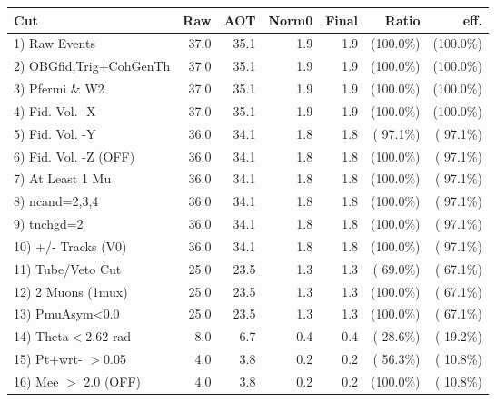 \begin{table}[h!]\centering
 \begin{tabular}{||l||r|r|r|r|r|r||}
 \hline
 \hline
 Cut & Raw & AOT & Norm0 & Final & Ratio & eff.       \\
 \hline
  1) Raw Events           &         37.0 &         35.1 &          1.9 &          1.9 & (100.0\%) & (100.0\%) \\
  2) OBGfid,Trig+CohGenTh &         37.0 &         35.1 &          1.9 &          1.9 & (100.0\%) & (100.0\%) \\
  3) Pfermi \& W2         &         37.0 &         35.1 &          1.9 &          1.9 & (100.0\%) & (100.0\%) \\
  4) Fid. Vol. -X         &         37.0 &         35.1 &          1.9 &          1.9 & (100.0\%) & (100.0\%) \\
  5) Fid. Vol. -Y         &         36.0 &         34.1 &          1.8 &          1.8 & ( 97.1\%) & ( 97.1\%) \\
  6) Fid. Vol. -Z (OFF)   &         36.0 &         34.1 &          1.8 &          1.8 & (100.0\%) & ( 97.1\%) \\
  7) At Least 1 Mu        &         36.0 &         34.1 &          1.8 &          1.8 & (100.0\%) & ( 97.1\%) \\
  8) ncand=2,3,4          &         36.0 &         34.1 &          1.8 &          1.8 & (100.0\%) & ( 97.1\%) \\
  9) tnchgd=2             &         36.0 &         34.1 &          1.8 &          1.8 & (100.0\%) & ( 97.1\%) \\
 10) +/- Tracks (V0)      &         36.0 &         34.1 &          1.8 &          1.8 & (100.0\%) & ( 97.1\%) \\
 11) Tube/Veto Cut        &         25.0 &         23.5 &          1.3 &          1.3 & ( 69.0\%) & ( 67.1\%) \\
 12) 2 Muons (1mux)       &         25.0 &         23.5 &          1.3 &          1.3 & (100.0\%) & ( 67.1\%) \\
 13) PmuAsym<0.0          &         25.0 &         23.5 &          1.3 &          1.3 & (100.0\%) & ( 67.1\%) \\
 14) Theta$<$2.62 rad     &          8.0 &          6.7 &          0.4 &          0.4 & ( 28.6\%) & ( 19.2\%) \\
 15) Pt+wrt- $>$0.05      &          4.0 &          3.8 &          0.2 &          0.2 & ( 56.3\%) & ( 10.8\%) \\
 16) Mee $>$ 2.0  (OFF)   &          4.0 &          3.8 &          0.2 &          0.2 & (100.0\%) & ( 10.8\%) \\

\end{tabular}
\end{table}
